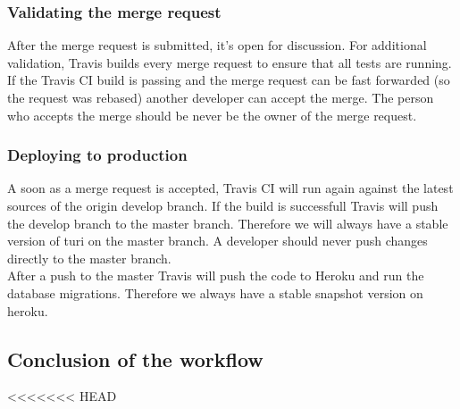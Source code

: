 \documentclass[a4paper]{article}
\begin{document}
\subsubsection{Validating the merge request}
After the merge request is submitted, it's open for discussion. For additional validation, Travis builds every merge request to ensure that all tests are running. If the Travis CI build is passing and the merge request can be fast forwarded (so the request was rebased) another developer can accept the merge. The person who accepts the merge should be never be the owner of the merge request.

\subsubsection{Deploying to production}
A soon as a merge request is accepted, Travis CI will run again against the latest sources of the origin develop branch. If the build is successfull Travis will push the develop branch to the master branch. Therefore we will always have a stable version of turi on the master branch. A developer should never push changes directly to the master branch.\\

\noindent
After a push to the master Travis will push the code to Heroku and run the database migrations. Therefore we always have a stable snapshot version on heroku.

\subsection{Conclusion of the workflow}

<<<<<<< HEAD
\end{document}

